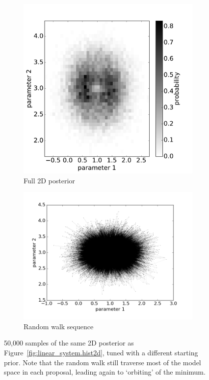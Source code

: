 \begin{figure}
	\centering
	\begin{subfigure}{.43\textwidth}
		\centering
		\includegraphics[width=\textwidth]{simple-linear-system/figures/2d_improved/mean_histogram_2d}
		\caption{Full 2D posterior}
		\label{}
	\end{subfigure}%
	\begin{subfigure}{.57\textwidth}
		\centering
		\includegraphics[width=\textwidth]{simple-linear-system/figures/2d_improved/mean_randomWalk}
		\caption{Random walk sequence}
		\label{}
	\end{subfigure}
	\caption{50,000 samples of the same 2D posterior as Figure~\ref{fig:linear_system.hist2d}, tuned with a different starting prior. Note that the random walk still traverse most of the model space in each proposal, leading again to `orbiting' of the minimum.}
	\label{fig:linear_system.improvedmean}
\end{figure}

